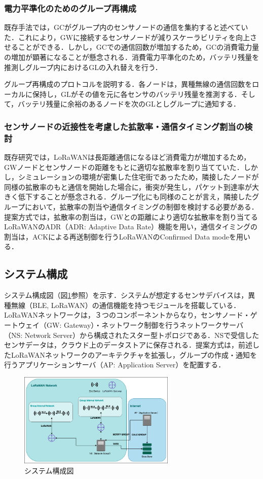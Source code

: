 \documentclass[Japanese]{dicomopapers}
\begin{document}
\subsubsection{電力平準化のためのグループ再構成}
既存手法\cite{group}では，GCがグループ内のセンサノードの通信を集約すると述べていた．これにより，GWに接続するセンサノードが減りスケーラビリティを向上させることができる．しかし，GCでの通信回数が増加するため，GCの消費電力量の増加が顕著になることが懸念される．消費電力平準化のため，バッテリ残量を推測しグループ内におけるGLの入れ替えを行う．
\par
グループ再構成のプロトコルを説明する．各ノードは，異種無線の通信回数をローカルに保持し，GLがその値を元に各センサのバッテリ残量を推測する．そして，バッテリ残量に余裕のあるノードを次のGLとしグループに通知する．
    
\subsubsection{センサノードの近接性を考慮した拡散率・通信タイミング割当の検討}
既存研究\cite{gateway}では，LoRaWANは長距離通信になるほど消費電力が増加するため，GWノードとセンサノードの距離をもとに適切な拡散率を割り当てていた．しかし，シミュレーションの環境が密集した住宅街であったため，隣接したノードが同様の拡散率のもと通信を開始した場合に，衝突が発生し，パケット到達率が大きく低下することが懸念される．グループ化にも同様のことが言え，隣接したグループにおいて，拡散率の割当や通信タイミングの制御を検討する必要がある．提案方式では，拡散率の割当は，GWとの距離により適切な拡散率を割り当てるLoRaWANのADR（ADR: Adaptive Data Rate）機能を用い，通信タイミングの割当は，ACKによる再送制御を行うLoRaWANのConfirmed Data modeを用いる．

\subsection{システム構成}
システム構成図（図\ref{tarako_architecture}参照）を示す．システムが想定するセンサデバイスは，異種無線（BLE, LoRaWAN）の通信機能を持つモジュールを搭載している．LoRaWANネットワークは，３つのコンポーネントからなり，センサノード・ゲートウェイ（GW: Gateway）・ネットワーク制御を行うネットワークサーバ（NS: Network Server）から構成されたスター型トポロジである．NSで受信したセンサデータは，クラウド上のデータストアに保存される．提案方式は，前述したLoRaWANネットワークのアーキテクチャを拡張し，グループの作成・通知を行うアプリケーションサーバ（AP: Application Server）を配置する．

\begin{figure}[h]
    \centering
    \includegraphics[width=7.5cm]{img/LoRaWAN.png}
    \caption{システム構成図}
    \label{tarako_architecture}
\end{figure}
\end{document}
